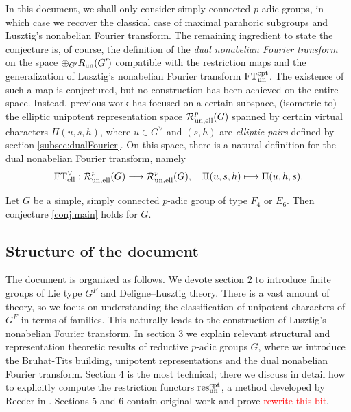In this document, we shall only consider simply connected $p$-adic groups, in which case we recover the classical case of maximal parahoric subgroups and Lusztig's nonabelian Fourier transform. The remaining ingredient to state the conjecture is, of course, the definition of the \textit{dual nonabelian Fourier transform} on the space $\oplus_{G'}R_{\mathrm{un}}(G')$ compatible with the restriction maps and the generalization of Lusztig's nonabelian Fourier transform $\mathrm{FT}_{\mathrm{un}}^{\mathrm{cpt}}$. The existence of such a map is conjectured, but no construction has been achieved on the entire space. Instead, previous work has focused on a certain subspace, (isometric to) the elliptic unipotent representation space $\mathcal{R}_{\mathrm{un},\mathrm{ell}}^p(G)$ spanned by certain virtual characters $\Pi(u,s,h)$, where $u\in G^\vee$ and $(s,h)$ are \textit{elliptic pairs} defined by section \ref{subsec:dualFourier}. On this space, there is a natural definition for the dual nonabelian Fourier transform, namely
\begin{equation*}
    \mathrm{FT}^\vee_{\mathrm{ell}}:\mathcal{R}_{\mathrm{un},\mathrm{ell}}^p(G)\longrightarrow\mathcal{R}_{\mathrm{un},\mathrm{ell}}^p(G),\quad\Pi(u,s,h)\longmapsto\Pi(u,h,s).
\end{equation*}
\fi



\begin{theorem} Let $G$ be a simple, simply connected $p$-adic group of type $F_4$ or $E_6$. Then conjecture \ref{conj:main} holds for $G$.    
\end{theorem}

\subsection*{Structure of the document}
The document is organized as follows. We devote section $2$ to introduce finite groups of Lie type $G^F$ and Deligne--Lusztig theory. There is a vast amount of theory, so we focus on understanding the classification of unipotent characters of $G^F$ in terms of families. This naturally leads to the construction of Lusztig's nonabelian Fourier transform. In section $3$ we explain relevant structural and representation theoretic results of reductive $p$-adic groups $G$, where we introduce the Bruhat-Tits building, unipotent representations and the dual nonabelian Fourier transform. Section $4$ is the most technical; there we discuss in detail how to explicitly compute the restriction functors $\mathrm{res}_{\mathrm{un}}^{\mathrm{cpt}}$, a method developed by Reeder in \cite{Reeder2000}. Sections $5$ and $6$ contain original work and prove \textcolor{red}{rewrite this bit}.




